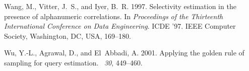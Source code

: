 \begin{thebibliography}{}
{\sc Wang, M.}, {\sc Vitter, J.~S.}, {\sc and} {\sc Iyer, B.~R.} 1997.
\newblock Selectivity estimation in the presence of alphanumeric correlations.
\newblock In {\em Proceedings of the Thirteenth International Conference on
  Data Engineering}. ICDE '97. IEEE Computer Society, Washington, DC, USA,
  169--180.

{\sc Wu, Y.-L.}, {\sc Agrawal, D.}, {\sc and} {\sc El~Abbadi, A.} 2001.
\newblock Applying the golden rule of sampling for query estimation.
~{\em 30}, 449--460.

\end{thebibliography}
\fi

